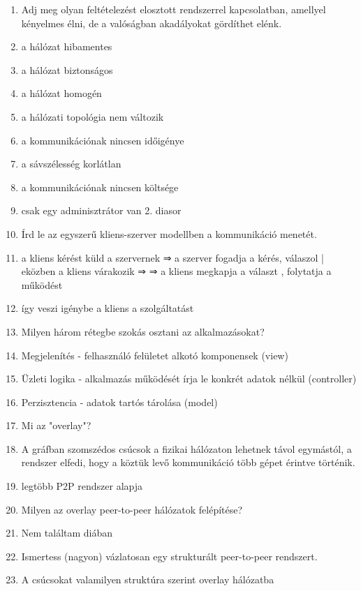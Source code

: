 \documentclass[twoside, a4paper, 12pt]{article}
\begin{document}
\begin{enumerate}
            \item  Adj meg olyan feltételezést elosztott rendszerrel kapcsolatban, amellyel kényelmes élni, de a valóságban akadályokat gördíthet elénk.
            \item a hálózat hibamentes
            \item a hálózat biztonságos
            \item a hálózat homogén
            \item a hálózati topológia nem változik
            \item a kommunikációnak nincsen időigénye
            \item a sávszélesség korlátlan
            \item a kommunikációnak nincsen költsége
            \item csak egy adminisztrátor van
                2. diasor
            \item  Írd le az egyszerű kliens-szerver modellben a kommunikáció menetét.
            \item a kliens kérést küld a szervernek ⇒  a szerver fogadja a kérés, válaszol | eközben a kliens várakozik ⇒
                ⇒ 	a kliens megkapja a választ , folytatja a működést 
            \item így veszi igénybe a kliens a szolgáltatást
            \item  Milyen három rétegbe szokás osztani az alkalmazásokat?
            \item Megjelenítés - felhasználó felületet alkotó komponensek (view)
            \item Üzleti logika - alkalmazás működését írja le konkrét adatok nélkül (controller)
            \item Perzisztencia - adatok tartós tárolása (model)
            \item  Mi az "overlay"?
            \item A gráfban szomszédos csúcsok a fizikai hálózaton lehetnek távol egymástól, a rendszer elfedi, hogy a köztük levő kommunikáció
                több gépet érintve történik.
            \item legtöbb P2P rendszer alapja
            \item  Milyen az overlay peer-to-peer hálózatok felépítése?
            \item  Nem találtam diában
            \item  Ismertess (nagyon) vázlatosan egy strukturált peer-to-peer rendszert.
            \item A csúcsokat valamilyen struktúra szerint overlay hálózatba

\end{enumerate}
\end{document}
